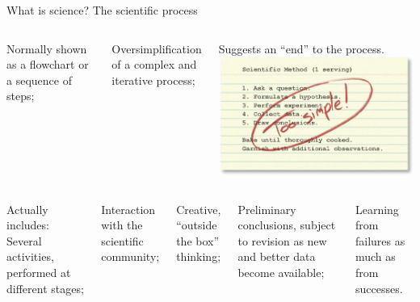 \documentclass[t]{beamer}
\begin{document}
\begin{ftst}
{What is science?}
{The scientific process}
\begin{columns}[T]
		\bitems Normally shown as a flowchart or a sequence of steps;
			\item Oversimplification of a complex and iterative process;
			\item Suggests an ``end'' to the process.
		\eitem
	 \includegraphics[width=\textwidth]{../figs/sciproc01.jpg}
\end{columns}
\vone
\begin{columns}[T]
		\bitems Actually includes:
			\bitems Several activities, performed at different stages;
			\item Interaction with the scientific community;
			\item Creative, ``outside the box'' thinking;
			\item Preliminary conclusions, subject to revision as new and better data become available;
			\item Learning from failures as much as from successes.
		\eitem
	\eitem
\end{columns}
\end{ftst}

\end{document}
